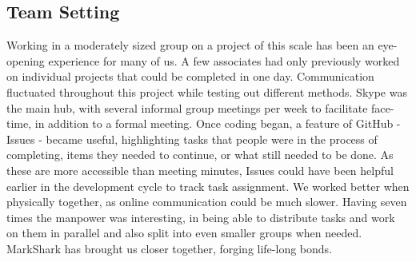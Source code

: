 \documentclass{article}
\begin{document}
\subsection{Team Setting}
Working in a moderately sized group on a project of this scale has been an eye-opening experience for many of us.  A few associates had only previously worked on individual projects that could be completed in one day.
Communication fluctuated throughout this project while testing out different methods.  Skype was the main hub, with several informal group meetings per week to facilitate face-time, in addition to a formal meeting.  Once coding began, a feature of GitHub - Issues - became useful, highlighting tasks that people were in the process of completing, items they needed to continue, or what still needed to be done.  As these are more accessible than meeting minutes, Issues could have been helpful earlier in the development cycle to track task assignment.  We worked better when physically together, as online communication could be much slower.  Having seven times the manpower was interesting, in being able to distribute tasks and work on them in parallel and also split into even smaller groups when needed.
MarkShark has brought us closer together, forging life-long bonds.
\end{document}

